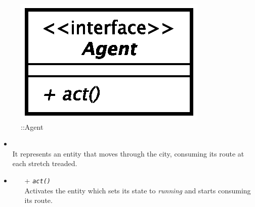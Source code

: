 \begin{figure}[h]
\centering
\includegraphics[scale=0.6,keepaspectratio]{images/solution/app/backend/agent.eps}
\caption{\pActive::Agent}
\label{fig:sd-app-agent}
\end{figure}
\FloatBarrier
\begin{itemize}
  \item \textbf{\descr} \\
    It represents an entity that moves through the city, consuming its 
route at each stretch treaded.
  \item \textbf{\ops}
  \begin{itemize}
    \item[+]  \texttt{\textit{act()}} \\
Activates the entity which sets its state to \textit{running} and 
starts consuming its route.
  \end{itemize}
\end{itemize}

